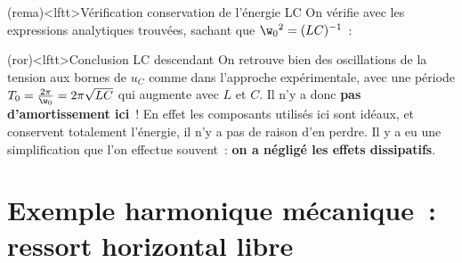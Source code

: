 \documentclass[../../main/main.tex]{subfiles}
\begin{document}
\begin{tcb}[label=impl](rema)<lftt>{Vérification conservation de l'énergie LC}
	On vérifie avec les expressions analytiques trouvées, sachant que
	$\w_0{}^2 = (LC)^{-1}$~:
	\vspace{-20pt}
\end{tcb}
\begin{tcb}[label=ror:amortissement](ror)<lftt>{Conclusion LC descendant}
	On retrouve bien des oscillations de la tension aux bornes de $u_C$ comme dans
	l'approche expérimentale, avec une période $T_0 = \frac{2\pi}{\w_0} =
		2\pi\sqrt{LC}$ qui augmente avec $L$ et $C$.
	\bigbreak
	Il n'y a donc \textbf{pas d'amortissement ici}~! En effet les composants
	utilisés ici sont idéaux, et conservent totalement l'énergie, il n'y a pas de
	raison d'en perdre.
	\bigbreak
	Il y a eu une simplification que l'on effectue souvent~:
	\textbf{on a négligé les effets dissipatifs}.
\end{tcb}

\section{Exemple harmonique mécanique~: ressort horizontal libre}
\end{document}
